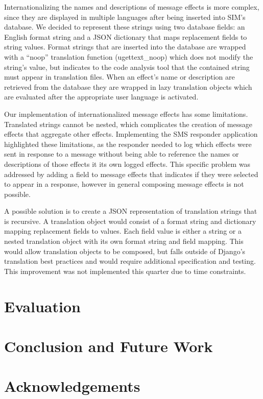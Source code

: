 \documentclass{acm_proc_article-sp}
\begin{document}
Internationalizing the names and descriptions of message effects is more complex, since they are displayed in multiple languages after being inserted into SIM’s database. We decided to represent these strings using two database fields: an English format string and a JSON dictionary that maps replacement fields to string values. Format strings that are inserted into the database are wrapped with a “noop” translation function (ugettext\_noop) which does not modify the string’s value, but indicates to the code analysis tool that the contained string must appear in translation files. When an effect’s name or description are retrieved from the database they are wrapped in lazy translation objects which are evaluated after the appropriate user language is activated.

Our implementation of internationalized message effects has some limitations. Translated strings cannot be nested, which complicates the creation of message effects that aggregate other effects. Implementing the SMS responder application highlighted these limitations, as the responder needed to log which effects were sent in response to a message without being able to reference the names or descriptions of those effects it its own logged effects. This specific problem was addressed by adding a field to message effects that indicates if they were selected to appear in a response, however in general composing message effects is not possible.

A possible solution is to create a JSON representation of translation strings that is recursive. A translation object would consist of a format string and dictionary mapping replacement fields to values. Each field value is either a string or a nested translation object with its own format string and field mapping. This would allow translation objects to be composed, but falls outside of Django’s translation best practices and would require additional specification and testing. This improvement was not implemented this quarter due to time constraints.

\section{Evaluation}

\section{Conclusion and Future Work}

\section{Acknowledgements}
\end{document}
